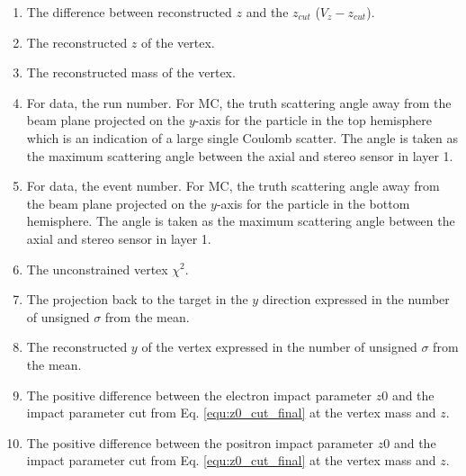 \begin{enumerate}
  \item The difference between reconstructed $z$ and the $z_{cut}$ ($V_z-z_{cut}$).
  \item The reconstructed $z$ of the vertex.
  \item The reconstructed mass of the vertex.
  \item For data, the run number. For MC, the truth scattering angle away from the beam plane projected on the $y$-axis for the particle in the top hemisphere which is an indication of a large single Coulomb scatter. The angle is taken as the maximum scattering angle between the axial and stereo sensor in layer 1.
  \item For data, the event number. For MC, the truth scattering angle away from the beam plane projected on the $y$-axis for the particle in the bottom hemisphere. The angle is taken as the maximum scattering angle between the axial and stereo sensor in layer 1.
  \item The unconstrained vertex $\chi^2$.
  \item The projection back to the target in the $y$ direction expressed in the number of unsigned $\sigma$ from the mean.
  \item The reconstructed $y$ of the vertex expressed in the number of unsigned $\sigma$ from the mean.
  \item The positive difference between the electron impact parameter $z0$ and the impact parameter cut from Eq. \ref{equ:z0_cut_final} at the vertex mass and $z$.
  \item The positive difference between the positron impact parameter $z0$ and the impact parameter cut from Eq. \ref{equ:z0_cut_final} at the vertex mass and $z$.
\end{enumerate}

